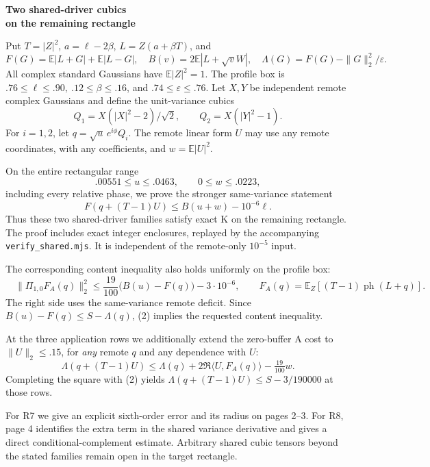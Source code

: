 \documentclass[11pt]{article}
\newcommand{\E}{\mathbb E}\newcommand{\R}{\mathbb R}\newcommand{\C}{\mathbb C}
\newcommand{\head}[1]{\par\smallskip{\large\bfseries\color{ink}#1}\par\smallskip}
\begin{document}
\thispagestyle{plain}
{\LARGE\bfseries\color{ink} Two shared-driver cubics\\[2pt] on the remaining rectangle\par}
\medskip
Put \(T=|Z|^2\), \(a=\ell-2\beta\), \(L=Z(a+\beta T)\), and
\[
 F(G)=\E|L+G|+\E|L-G|,\quad B(v)=2\E|L+\sqrt vW|,\quad
 \Lambda(G)=F(G)-\|G\|_2^2/\varepsilon.
\]
All complex standard Gaussians have \(\E|Z|^2=1\). The profile box is
\(.76\le\ell\le.90,\ .12\le\beta\le.16\), and \(.74\le\varepsilon\le.76\).
Let \(X,Y\) be independent remote complex Gaussians and define the unit-variance cubics
\[
 Q_1=X(|X|^2-2)/\sqrt2,\qquad Q_2=X(|Y|^2-1).
\]
For \(i=1,2\), let \(q=\sqrt u\,e^{i\phi}Q_i\). The remote linear form \(U\) may
use any remote coordinates, with any coefficients, and \(w=\E|U|^2\).

\head{Results}
On the entire rectangular range
\[
 \boxed{\qquad .00551\le u\le.0463,\qquad 0\le w\le.0223,\qquad}
\]
including every relative phase, we prove the stronger same-variance statement
\[
 \boxed{\quad F(q+(T-1)U)\le B(u+w)-10^{-6}\ell.\quad} \tag{1}
\]
Thus these two shared-driver families satisfy exact K on the remaining rectangle.
The proof includes exact integer enclosures, replayed by the accompanying
\texttt{verify\_shared.mjs}. It is independent of the remote-only \(10^{-5}\) input.

The corresponding content inequality also holds uniformly on the profile box:
\[
 \boxed{\quad
 \|\Pi_{1,0}F_A(q)\|_2^2
 \le \frac{19}{100}\bigl(B(u)-F(q)\bigr)-3\cdot10^{-6},
 \qquad F_A(q)=\E_Z[(T-1)\operatorname{ph}(L+q)] .
 \quad} \tag{2}
\]
The right side uses the same-variance remote deficit. Since
\(B(u)-F(q)\le S-\Lambda(q)\), (2) implies the requested content inequality.

At the three application rows we additionally extend the zero-buffer A cost to
\(\|U\|_2\le.15\), for \emph{any} remote \(q\) and any dependence with \(U\):
\[
 \Lambda(q+(T-1)U)\le\Lambda(q)+2\Re\langle U,F_A(q)\rangle-\tfrac{19}{100}w.
 \tag{3}
\]
Completing the square with (2) yields \(\Lambda(q+(T-1)U)\le S-3/190000\) at those rows.

For R7 we give an explicit sixth-order error and its radius on pages 2--3.
For R8, page 4 identifies the extra term in the shared variance derivative and gives
a direct conditional-complement estimate. Arbitrary shared cubic tensors beyond
the stated families remain open in the target rectangle.
\end{document}
